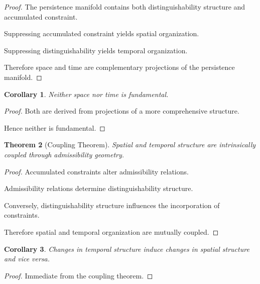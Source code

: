 \documentclass[12pt,oneside]{article}
\newtheorem{theorem}{Theorem}[section] \newtheorem{lemma}[theorem]{Lemma} \newtheorem{proposition}[theorem]{Proposition} \newtheorem{corollary}[theorem]{Corollary}
\theoremstyle{definition}
\begin{document}
\begin{proof}

The persistence manifold contains both distinguishability structure and accumulated constraint.

Suppressing accumulated constraint yields spatial organization.

Suppressing distinguishability yields temporal organization.

Therefore space and time are complementary projections of the persistence manifold.

\end{proof}

\begin{corollary}

Neither space nor time is fundamental.

\end{corollary}

\begin{proof}

Both are derived from projections of a more comprehensive structure.

Hence neither is fundamental.

\end{proof}

\begin{theorem}[Coupling Theorem]

Spatial and temporal structure are intrinsically coupled through admissibility geometry.

\end{theorem}

\begin{proof}

Accumulated constraints alter admissibility relations.

Admissibility relations determine distinguishability structure.

Conversely, distinguishability structure influences the incorporation of constraints.

Therefore spatial and temporal organization are mutually coupled.

\end{proof}

\begin{corollary}

Changes in temporal structure induce changes in spatial structure and vice versa.

\end{corollary}

\begin{proof}

Immediate from the coupling theorem.

\end{proof}
\end{document}
